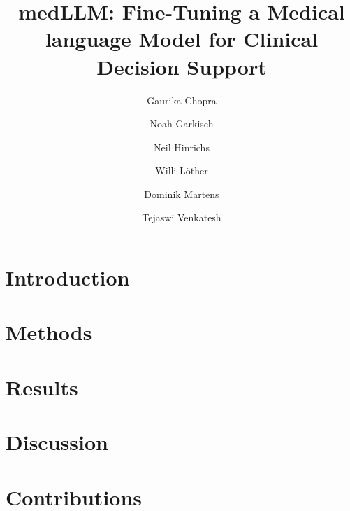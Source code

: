 \documentclass[unnumsec,webpdf,contemporary,large]{oup-authoring-template}%
\begin{document}


\graphicspath{{fig/}}


\title[Fine-Tuning LLM for Clinical Decision Support]{medLLM: Fine-Tuning a Medical language Model for Clinical Decision Support}

\author{Gaurika Chopra}
\author{Noah Garkisch}
\author{Neil Hinrichs}
\author{Willi Löther}
\author{Dominik Martens}
\author{Tejaswi Venkatesh}

\maketitle



\section{Introduction}


\section{Methods}


\section{Results}


\section{Discussion}


\section{Contributions}



%
%






\end{document}
